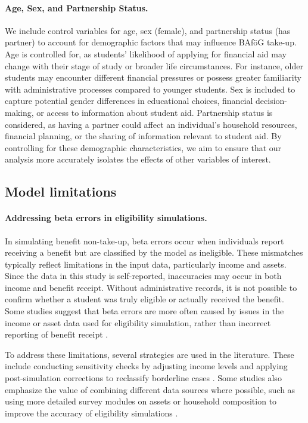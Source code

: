\paragraph{Age, Sex, and Partnership Status.}
We include control variables for age, sex (female), and partnership status (has partner) to account for demographic factors that may influence BAföG take-up. 
Age is controlled for, as students’ likelihood of applying for financial aid may change with their stage of study or broader life circumstances. 
For instance, older students may encounter different financial pressures or possess greater familiarity with administrative processes compared to younger students.
Sex is included to capture potential gender differences in educational choices, financial decision-making, or access to information about student aid. 
Partnership status is considered, as having a partner could affect an individual’s household resources, financial planning, or the sharing of information relevant to student aid. 
By controlling for these demographic characteristics, we aim to ensure that our analysis more accurately isolates the effects of other variables of interest.



\subsection{Model limitations}
\label{subsection:model_limitations}
\paragraph{Addressing beta errors in eligibility simulations.}
In simulating benefit non-take-up, beta errors occur when individuals report receiving a benefit but are classified by the model as ineligible. 
These mismatches typically reflect limitations in the input data, particularly income and assets.
Since the data in this study is self-reported, inaccuracies may occur in both income and benefit receipt.
Without administrative records, it is not possible to confirm whether a student was truly eligible or actually received the benefit. 
Some studies suggest that beta errors are more often caused by issues in the income or asset data used for eligibility simulation, rather than incorrect reporting of benefit receipt \citep{frick_claim_2007, janssens_takemod_2022}. 

To address these limitations, several strategies are used in the literature. 
These include conducting sensitivity checks by adjusting income levels and applying post-simulation corrections to reclassify borderline cases \citep{herber_non-take-up_2019}. 
Some studies also emphasize the value of combining different data sources where possible, such as using more detailed survey modules on assets or household composition to improve the accuracy of eligibility simulations \citep{janssens_takemod_2022}. 

